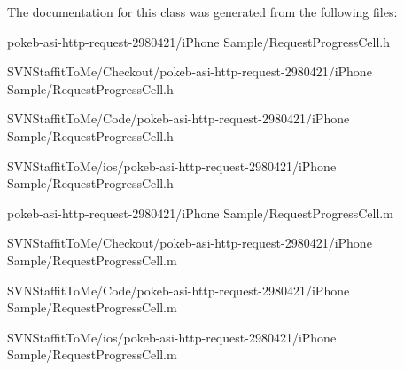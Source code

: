 \-The documentation for this class was generated from the following files\-:\begin{DoxyCompactItemize}
\item 
pokeb-\/asi-\/http-\/request-\/2980421/i\-Phone Sample/\-Request\-Progress\-Cell.\-h\item 
\-S\-V\-N\-Staffit\-To\-Me/\-Checkout/pokeb-\/asi-\/http-\/request-\/2980421/i\-Phone Sample/\-Request\-Progress\-Cell.\-h\item 
\-S\-V\-N\-Staffit\-To\-Me/\-Code/pokeb-\/asi-\/http-\/request-\/2980421/i\-Phone Sample/\-Request\-Progress\-Cell.\-h\item 
\-S\-V\-N\-Staffit\-To\-Me/ios/pokeb-\/asi-\/http-\/request-\/2980421/i\-Phone Sample/\-Request\-Progress\-Cell.\-h\item 
pokeb-\/asi-\/http-\/request-\/2980421/i\-Phone Sample/\-Request\-Progress\-Cell.\-m\item 
\-S\-V\-N\-Staffit\-To\-Me/\-Checkout/pokeb-\/asi-\/http-\/request-\/2980421/i\-Phone Sample/\-Request\-Progress\-Cell.\-m\item 
\-S\-V\-N\-Staffit\-To\-Me/\-Code/pokeb-\/asi-\/http-\/request-\/2980421/i\-Phone Sample/\-Request\-Progress\-Cell.\-m\item 
\-S\-V\-N\-Staffit\-To\-Me/ios/pokeb-\/asi-\/http-\/request-\/2980421/i\-Phone Sample/\-Request\-Progress\-Cell.\-m\end{DoxyCompactItemize}
